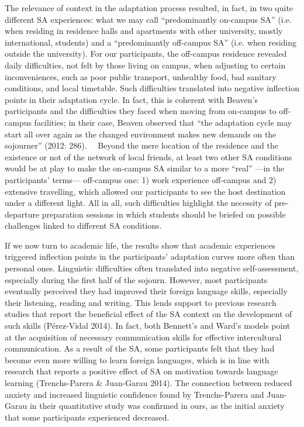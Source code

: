 \documentclass[12pt]{article}
\newenvironment{styleStandard}{\setlength\leftskip{0cm}\setlength\rightskip{0cm plus 1fil}\setlength\parindent{0cm}\setlength\parfillskip{0pt plus 1fil}\setlength\parskip{0in plus 1pt}\writerlistparindent\writerlistleftskip\leavevmode\normalfont\normalsize\writerlistlabel\ignorespaces}{\unskip\vspace{0.111in plus 0.0111in}\par}
\newcommand\writerlistleftskip{}
\newcommand\writerlistparindent{}
\newcommand\writerlistlabel{}
\begin{document}
\begin{styleStandard}
The relevance of context in the adaptation process resulted, in fact, in two quite different SA experiences: what we may call “predominantly on-campus SA” (i.e. when residing in residence halls and apartments with other university, mostly international, students) and a “predominantly off-campus SA” (i.e. when residing outside the university). For our participants, the off-campus residence revealed daily difficulties, not felt by those living on campus, when adjusting to certain inconveniences, such as poor public transport, unhealthy food, bad sanitary conditions, and local timetable. Such difficulties translated into negative inflection points in their adaptation cycle. In fact, this is coherent with Beaven’s participants and the difficulties they faced when moving from on-campus to off-campus facilities; in their case, Beaven observed that “the adaptation cycle may start all over again as the changed environment makes new demands on the sojourner” (2012: 286). \ \ Beyond the mere location of the residence and the existence or not of the network of local friends, at least two other SA conditions would be at play to make the on-campus SA similar to a more “real” —in the participants’ terms— off-campus one: 1) work experience off-campus and 2) extensive travelling, which allowed our participants to see the host destination under a different light. All in all, such difficulties highlight the necessity of pre-departure preparation sessions in which students should be briefed on possible challenges linked to different SA conditions.
\end{styleStandard}

\begin{styleStandard}
If we now turn to academic life, the results show that academic experiences triggered inflection points in the participants’ adaptation curves more often than personal ones. Linguistic difficulties often translated into negative self-assessment, especially during the first half of the sojourn. However, most participants eventually perceived they had improved their foreign language skills, especially their listening, reading and writing. This lends support to previous research studies that report the beneficial effect of the SA context on the development of such skills (Pérez-Vidal 2014). In fact, both Bennett’s and Ward’s models point at the acquisition of necessary communication skills for effective intercultural communication. As a result of the SA, some participants felt that they had become even more willing to learn foreign languages, which is in line with research that reports a positive effect of SA on motivation towards language learning (Trenchs-Parera \& Juan-Garau 2014). The connection between reduced anxiety and increased linguistic confidence found by Trenchs-Parera and Juan-Garau in their quantitative study was confirmed in ours, as the initial anxiety that some participants experienced decreased. 
\end{styleStandard}
\end{document}
